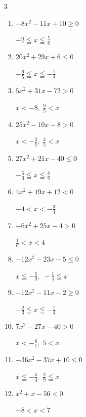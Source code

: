 \begin{multicols}{3}
\begin{enumerate}
  \itemsep=30pt
  \item $-8x^{2}-11x+10\geq 0$

        $\displaystyle -2 \leqq x \leqq \frac{5}{8}$

  \item $20x^{2}+29x+6\leq 0$

        $\displaystyle -\frac{6}{5} \leqq x \leqq -\frac{1}{4}$

  \item $5x^{2}+31x-72>0$

        $\displaystyle x < -8 , \; \frac{9}{5} < x$

  \item $25x^{2}-10x-8>0$

        $\displaystyle x < -\frac{2}{5} , \; \frac{4}{5} < x$

  \item $27x^{2}+21x-40\leq 0$

        $\displaystyle -\frac{5}{3} \leqq x \leqq \frac{8}{9}$

  \item $4x^{2}+19x+12<0$

        $\displaystyle -4 < x < -\frac{3}{4}$

  \item $-6x^{2}+25x-4>0$

        $\displaystyle \frac{1}{6} < x < 4$

  \item $-12x^{2}-23x-5\leq 0$

        $\displaystyle x \leqq -\frac{5}{3} , \; -\frac{1}{4} \leqq x$

  \item $-12x^{2}-11x-2\geq 0$

        $\displaystyle -\frac{2}{3} \leqq x \leqq -\frac{1}{4}$

  \item $7x^{2}-27x-40>0$

        $\displaystyle x < -\frac{8}{7} , \; 5 < x$

\columnbreak %

  \item $-36x^{2}-37x+10\leq 0$

        $\displaystyle x \leqq -\frac{5}{4} , \; \frac{2}{9} \leqq x$

  \item $x^{2}+x-56<0$

        $\displaystyle -8 < x < 7$


\end{enumerate}
\end{multicols}
